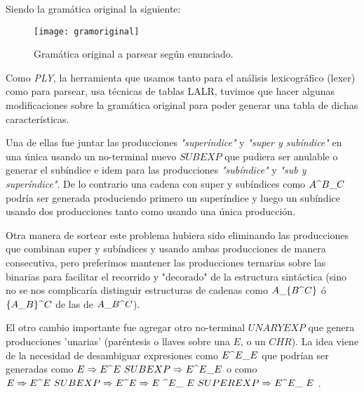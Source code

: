 Siendo la gramática original la siguiente:

\begin{figure}
    \centering
    \texttt{[image: gramoriginal]}
    \caption{Gramática original a parsear según enunciado.}
    \label{fig:gram_original}
\end{figure}

Como \emph{PLY}, la herramienta que usamos tanto para el análisis lexicográfico (lexer) como para parsear, usa técnicas de tablas LALR, tuvimos que hacer algunas modificaciones sobre la gramática original para poder generar una tabla de dichas características. \newline

Una de ellas fue juntar las producciones \emph{"superíndice"} y \emph{"super y subíndice"} en una única usando un no-terminal nuevo $SUBEXP$ que pudiera ser anulable o generar el subíndice e idem para las producciones \emph{"subíndice"} y \emph{"sub y superíndice"}. De lo contrario una cadena con super y subíndices  como $A\super B\sub C$ podría ser generada produciendo primero un superíndice y luego un subíndice usando dos producciones tanto como usando una única producción. \newline

Otra manera de sortear este problema hubiera sido eliminando las producciones que combinan super y subíndices y usando ambas producciones de manera consecutiva, pero preferimos mantener las producciones ternarias sobre las binarias para facilitar el recorrido y "decorado" de la estructura sintáctica (sino no se nos complicaría distinguir estructuras de cadenas como $ A\sub \{B\super C\} $ ó $\{A\sub B\}\super C$ de las de $A\sub B\super C$). \newline

El otro cambio importante fue agregar otro no-terminal $UNARYEXP$ que genera producciones 'unarias' (paréntesis o llaves sobre una $E$, o un $CHR$). La idea viene de la necesidad de desambiguar expresiones como $E\super E\sub E$ que podrían ser generadas como $E \Rightarrow E \super  E\ SUBEXP \Rightarrow E\super E\sub E$ o como $E \Rightarrow  E \super  E\ SUBEXP \Rightarrow E \super  E \Rightarrow E\ \super  E\sub \ E\ SUPEREXP \Rightarrow E \super  E\sub \ E\ $. \newline

